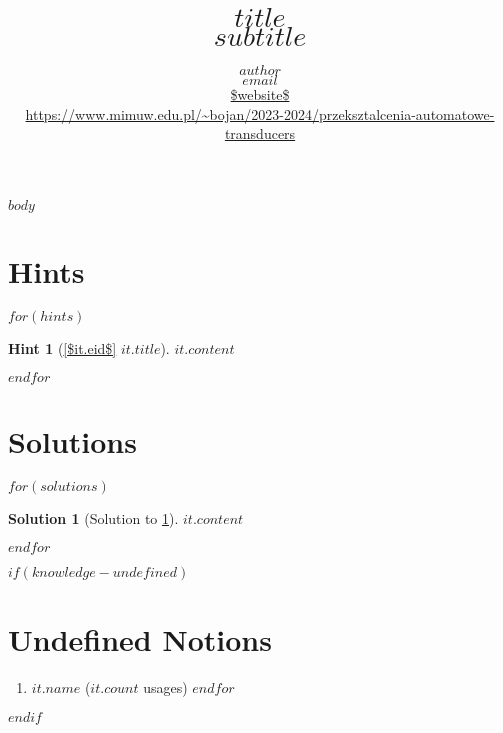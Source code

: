 \documentclass[a4,10pt]{article}
\title{{\bfseries \Huge{$title$}} \\ $subtitle$}
\author{$author$ \\ \href{mailto:$email$}{$email$} \\ \url{$website$} \\
    \url{https://www.mimuw.edu.pl/~bojan/2023-2024/przeksztalcenia-automatowe-transducers}
}
\newtheorem{hint}{Hint}
\newtheorem{solution}{Solution}
\begin{document}
\maketitle

$body$

\clearpage
\appendix

\section{Hints}

$for(hints)$
\begin{hint}[{\cref{$it.eid$} $it.title$}]
    \label{$it.id$}
    $it.content$
\end{hint}
$endfor$

\clearpage
\section{Solutions}

$for(solutions)$
\begin{solution}[Solution to \cref{$it.id$}]
    \label{$it.id$:solution}
    $it.content$
\end{solution}
$endfor$

$if(knowledge-undefined)$
\clearpage
\section{Undefined Notions}
\begin{enumerate}
$for(knowledge-undefined)$
\item \texttt{$it.name$} ($it.count$ usages)
$endfor$
\end{enumerate}
$endif$
\end{document}
